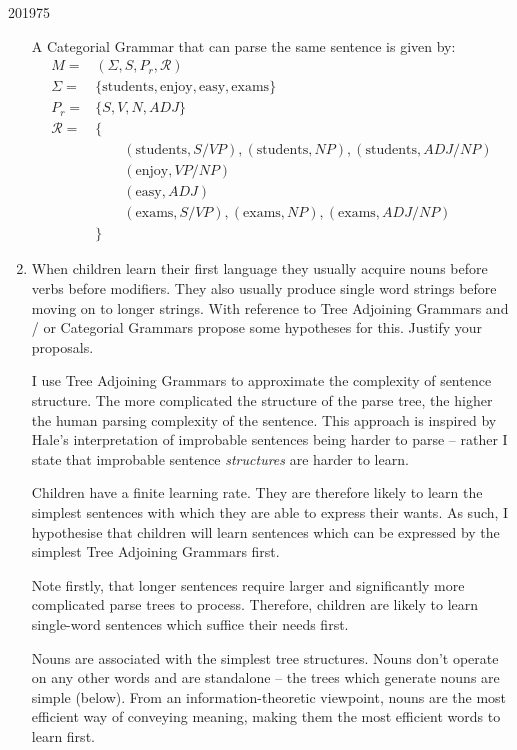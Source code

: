 \documentclass[10pt,\jkfside,a4paper]{article}
\newcommand{\np}{\ensuremath{N\!P}}
\newcommand{\vp}{\ensuremath{V\!P}}
\newcommand{\adj}{\ensuremath{ADJ}}
\begin{document}
\begin{examquestion}{2019}{7}{5}
\begin{enumerate}[label=(\alph*)]
A Categorial Grammar that can parse the same sentence is given by:
\begin{align*}
M =& (\Sigma, S, P_r, \mathcal R) \\
\Sigma =& \{\text{students}, \text{enjoy}, \text{easy}, \text{exams}\} \\
P_r =& \{S, V, N, \adj\} \\
\mathcal R =& \{\\
&\qquad (\text{students}, S/\vp), (\text{students}, \np), (\text{students},
\adj/\np) \\
&\qquad (\text{enjoy}, \vp/\np) \\
&\qquad (\text{easy}, \adj) \\
&\qquad (\text{exams}, S/\vp), (\text{exams}, \np), (\text{exams}, \adj/\np)\\
&\}
\end{align*}

\item When children learn their first language they usually acquire nouns
before verbs before modifiers. They also usually produce single word strings
before moving on to longer strings. With reference to Tree Adjoining Grammars
and / or Categorial Grammars propose some hypotheses for this. Justify your
proposals.

I use Tree Adjoining Grammars to approximate the complexity of sentence
structure. The more complicated the structure of the parse tree, the higher
the human parsing complexity of the sentence. This approach is inspired by
Hale's interpretation of improbable sentences being harder to parse --
rather I state that improbable sentence \textit{structures} are harder to
learn.

Children have a finite learning rate. They are therefore likely to learn the
simplest sentences with which they are able to express their wants. As such,
I hypothesise that children will learn sentences which can be expressed by
the simplest Tree Adjoining Grammars first.

Note firstly, that longer sentences require larger and significantly more
complicated parse trees to process. Therefore, children are likely to learn
single-word sentences which suffice their needs first.

Nouns are associated with the simplest tree structures. Nouns don't operate
on any other words and are standalone -- the trees which generate nouns are
simple (below). From an information-theoretic viewpoint, nouns are the most
efficient way of conveying meaning, making them the most efficient words to
learn first.
\tikzset{
node distance = 1cm
}
\begin{figure}[H]
\centering
{}
\end{figure}


\end{enumerate}
\end{examquestion}
\end{document}
